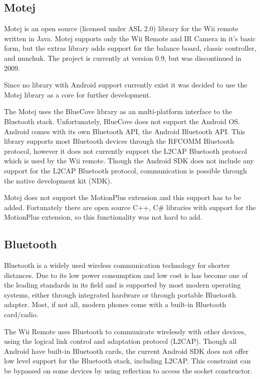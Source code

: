 \documentclass[11pt,twoside,a4paper]{report}
\begin{document}
\subsection{Motej}
Motej is an open source (licensed under ASL 2.0) library for the Wii remote written in Java. Motej supports only the Wii Remote and IR Camera in it's basic form, but the extras library adds support for the balance board, classic controller, and nunchuk. The project is currently at version 0.9, but was discontinued in 2009. \cite{Motej}

Since no library with Android support currently exist it was decided to use the Motej library as a core for further development.

The Motej uses the BlueCove library as an multi-platform interface to the Bluetooth stack. Unfortunately, BlueCove does not support the Android OS. Android comes with its own Bluetooth API, the Android Bluetooth API. This library supports most Bluetooth devices through the RFCOMM Bluetooth protocol, however it does not currently support the L2CAP Bluetooth protocol which is used by the Wii remote. Though the Android SDK does not include any support for the L2CAP Bluetooth protocol, communication is possible through the native development kit (NDK). %

Motej does not support the MotionPlus extension and this support has to be added. Fortunately there are open source C++, C\# libraries with support for the MotionPlus extension, so this functionality was not hard to add.


\subsection{Bluetooth}
Bluetooth is a widely used wireless communication technology for shorter distances. Due to its low power consumption and low cost is has become one of the leading standards in its field and is supported by most modern operating systems, either through integrated hardware or through portable Bluetooth adapter. Most, if not all, modern phones come with a built-in Bluetooth card/radio. %

The Wii Remote uses Bluetooth to communicate wirelessly with other devices, using the logical link control and adaptation protocol (L2CAP). Though all Android have built-in Bluetooth cards, the current Android SDK does not offer low level support for the Bluetooth stack, including L2CAP. This constraint can be bypassed on some devices by using reflection to access the socket constructor. %



\end{document}
